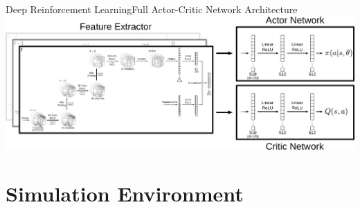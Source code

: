 \begin{frame}{Deep Reinforcement Learning}{Full Actor-Critic Network Architecture}
    \centering
    \includegraphics[width=\textwidth]{graphics/actor_critic_network_full.pdf}
\end{frame}


\section{Simulation Environment}

